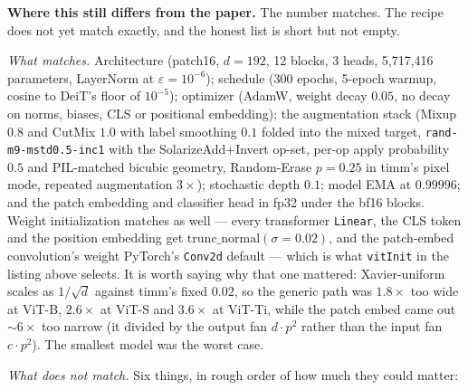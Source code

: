 \textbf{Where this still differs from the paper.} The number matches.
The recipe does not yet match exactly, and the honest list is short but
not empty.

\emph{What matches.} Architecture (patch16, $d{=}192$, 12 blocks, 3
heads, 5{,}717{,}416 parameters, LayerNorm at $\varepsilon = 10^{-6}$);
schedule (300 epochs, 5-epoch warmup, cosine to DeiT's floor of
$10^{-5}$); optimizer (AdamW, weight decay $0.05$, no decay on
norms, biases, CLS or positional embedding); the augmentation stack (Mixup $0.8$ and CutMix
$1.0$ with label smoothing $0.1$ folded into the mixed target,
\texttt{rand-m9-mstd0.5-inc1} with the SolarizeAdd$+$Invert
op-set, per-op apply probability $0.5$ and PIL-matched bicubic geometry,
Random-Erase $p{=}0.25$ in timm's pixel mode,
repeated augmentation $3\times$); stochastic depth $0.1$; model EMA
at $0.99996$; and the patch embedding and classifier head in fp32 under
the bf16 blocks. Weight initialization matches as well --- every
transformer \texttt{Linear}, the CLS token and the position embedding get
$\mathrm{trunc\_normal}(\sigma{=}0.02)$, and the patch-embed
convolution's weight PyTorch's \texttt{Conv2d} default ---
which is what \texttt{vitInit} in the listing above selects. It is worth
saying why that one mattered: Xavier-uniform scales as $1/\sqrt{d}$
against timm's fixed $0.02$, so the generic path was
$1.8\times$ too wide at ViT-B, $2.6\times$ at ViT-S and $3.6\times$ at
ViT-Ti, while the patch embed came out ${\sim}6\times$ too narrow
(it divided by the output fan $d\cdot p^2$ rather than the input fan
$c\cdot p^2$). The smallest model was the worst case.

\emph{What does not match.} Six things, in rough order of how much
they could matter:

